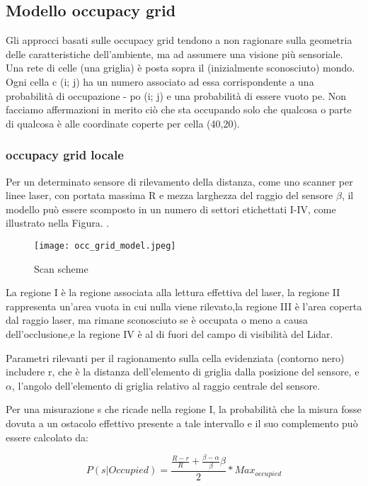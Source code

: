 \subsection{Modello occupacy grid}

Gli approcci basati sulle occupacy grid tendono a non ragionare sulla geometria delle caratteristiche  dell'ambiente, ma ad assumere una visione più sensoriale. Una rete di celle (una griglia) è posta sopra il
(inizialmente sconosciuto) mondo. Ogni cella c (i; j) ha un numero associato ad essa corrispondente
a una probabilità di occupazione - po (i; j) e una probabilità di essere vuoto pe. Non facciamo affermazioni in merito ciò che sta occupando solo che qualcosa o parte di qualcosa è alle coordinate coperte
per cella (40,20).

\subsubsection{occupacy grid locale}
Per un determinato sensore di rilevamento della distanza, come uno scanner per linee laser, con portata massima R e mezza larghezza del raggio del sensore $\beta$, il modello può essere scomposto in un numero di settori etichettati I-IV, come illustrato nella Figura. .

\begin{figure}
  \texttt{[image: occ\_grid\_model.jpeg]}
  \caption{Scan scheme}
  \label{fig:scan scheme}
\end{figure}

La regione I è la regione associata alla lettura effettiva del laser, la regione II rappresenta un'area vuota in cui nulla viene rilevato,la regione III è l'area coperta dal raggio laser, ma rimane sconosciuto se è occupata o meno a causa dell'occlusione,e la regione IV è al di fuori del campo di visibilità del Lidar.

Parametri rilevanti per il ragionamento sulla cella evidenziata (contorno nero) includere r, che è la distanza dell'elemento di griglia dalla posizione del sensore, e $\alpha$, l'angolo dell'elemento di griglia relativo al raggio centrale del sensore.

Per una misurazione s che ricade nella regione I, la probabilità che la misura fosse dovuta a un
ostacolo effettivo presente a tale intervallo e il suo complemento può essere calcolato da:

\begin{equation}	
\label{eq:lidargrid}
P(s|Occupied) = \frac{\frac{R-r}{R} + \frac{ \beta- \alpha}{\beta} \beta}{2}*Max_{occupied}
\end{equation}

